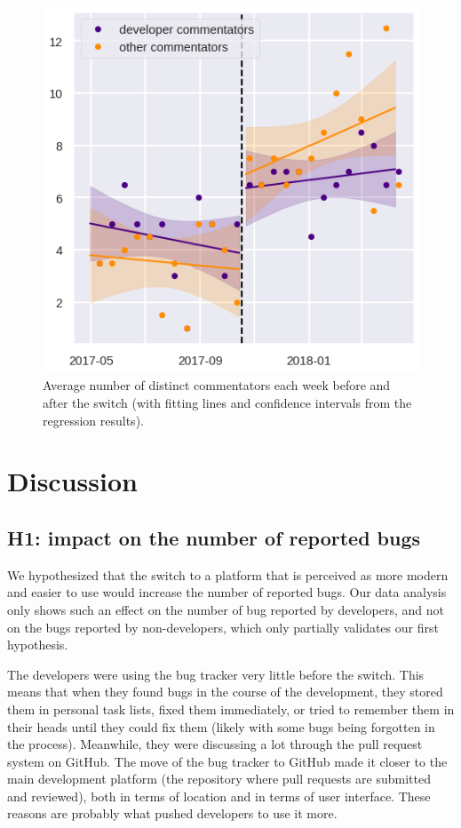 \documentclass[conference]{IEEEtran}
\begin{document}
\begin{figure}
\includegraphics{commentator_nb_rd.png}
\caption{Average number of distinct commentators each week before and after the switch (with fitting lines and confidence intervals from the regression results).} \label{commentator_nb_rd}
\end{figure}

\section{Discussion}
\label{discussion}

\subsection{H1: impact on the number of reported bugs}

We hypothesized that the switch to a platform that is perceived as more modern and easier to use would increase the number of reported bugs. Our data analysis only shows such an effect on the number of bug reported by developers, and not on the bugs reported by non-developers, which only partially validates our first hypothesis.

The developers were using the bug tracker very little before the switch. This means that when they found bugs in the course of the development, they stored them in personal task lists, fixed them immediately, or tried to remember them in their heads until they could fix them (likely with some bugs being forgotten in the process). Meanwhile, they were discussing a lot through the pull request system on GitHub. The move of the bug tracker to GitHub made it closer to the main development platform (the repository where pull requests are submitted and reviewed), both in terms of location and in terms of user interface. These reasons are probably what pushed developers to use it more.
\end{document}
